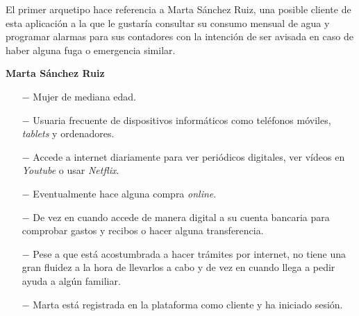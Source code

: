 \documentclass[pdftex,11pt,a4paper]{book}
\begin{document}
El primer arquetipo hace referencia a Marta Sánchez Ruiz, una posible cliente de esta aplicación a la que le gustaría consultar su consumo mensual de agua y programar alarmas para sus contadores con la intención de ser avisada en caso de haber alguna fuga o emergencia similar.

\vspace{5mm}

\textbf{Marta Sánchez Ruiz}
\vspace{-4mm}
\begin{itemize}
\addtolength{\itemsep}{-2mm}
\item [$-$] Mujer de mediana edad. 
\item [$-$] Usuaria frecuente de dispositivos informáticos como teléfonos móviles, \textit{tablets} y ordenadores.
\item [$-$] Accede a internet diariamente para ver periódicos digitales, ver vídeos en \textit{Youtube} o usar \textit{Netflix}.
\item [$-$] Eventualmente hace alguna compra \textit{online}.
\item [$-$] De vez en cuando accede de manera digital a su cuenta bancaria para comprobar gastos y recibos o hacer alguna transferencia.
\item [$-$] Pese a que está acostumbrada a hacer trámites por internet, no tiene una gran fluidez a la hora de llevarlos a cabo y de vez en cuando llega a pedir ayuda a algún familiar.
\item [$-$] Marta está registrada en la plataforma como cliente y ha iniciado sesión.
\end{itemize}

\vspace{5mm}

\renewcommand{\tablename}{Tabla}
\renewcommand{\arraystretch}{1,7}
\end{document}
